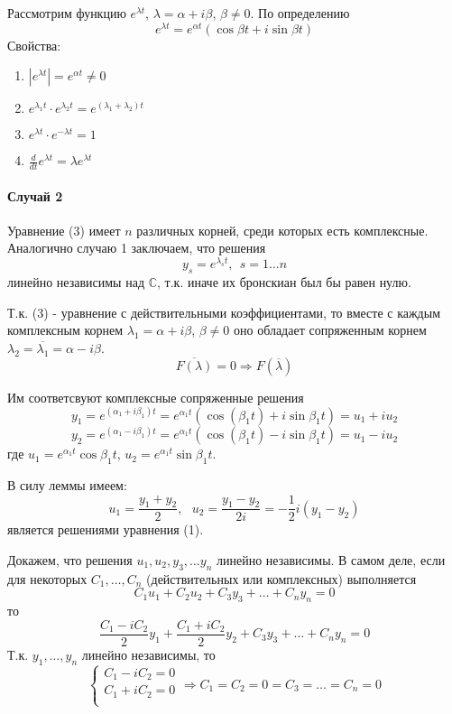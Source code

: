 Рассмотрим функцию $e^{\lambda t}$, $\lambda = \alpha + i \beta$, $\beta \neq 0$. По определению
\[ e^{\lambda t} = e^{\alpha t}(\cos \beta t + i\sin \beta t) \]
Свойства:
\begin{enumerate}
	\item $|e^{\lambda t}| = e^{\alpha t} \neq 0$
	\item $e^{\lambda_1 t} \cdot e^{\lambda_2 t} = e^{(\lambda_1 + \lambda_2)t}$
	\item $e^{\lambda t} \cdot e^{-\lambda t} = 1 $
	\item $\frac{d}{dt} e^{\lambda t}= \lambda e^{\lambda t}$
\end{enumerate}

\paragraph{Случай 2}
Уравнение (3) имеет $n$ различных корней, среди которых есть комплексные. Аналогично случаю 1 заключаем, что решения
\[ y_s = e^{\lambda_s t},~~ s = 1 \ldots n \]
линейно независимы над $\mathbb{C}$, т.к. иначе их бронскиан был бы равен нулю.

Т.к. (3) - уравнение с действительными коэффициентами, то вместе с каждым комплексным корнем $\lambda_1 = \alpha + i\beta$, $\beta \neq 0$ оно обладает сопряженным корнем $\lambda_2 = \overline{\lambda_1} = \alpha - i\beta$.
\[ \overline{F(\lambda)} = 0  \Rightarrow F(\overline{\lambda}) \]

Им соответсвуют комплексные сопряженные решения
\[ y_1 = e^{(\alpha_1 + i \beta_1)t} = e^{\alpha_1t}(\cos (\beta_1t) + i\sin{\beta_1t}) = u_1 + iu_2 \]
\[ y_2 = e^{(\alpha_1 - i \beta_1)t} = e^{\alpha_1t}(\cos (\beta_1t) - i\sin{\beta_1t}) = u_1 - iu_2 \]
где $u_1 = e^{\alpha_1 t}\cos\beta_1t$, $u_2 = e^{\alpha_1 t}\sin\beta_1t$.

В силу леммы имеем:
\[ u_1 = \frac{y_1 + y_2}{2},~~~ u_2 = \frac{y_1 - y_2}{2i} = -\frac{1}{2}i(y_1 - y_2) \]
является решениями уравнения (1).

Докажем, что решения $u_1, u_2, y_3, \ldots y_n$ линейно независимы. В самом деле, если для некоторых $C_1, \ldots, C_n$ (действительных или комплексных) выполняется
\[ C_1u_1 + C_2u_2 + C_3y_3 + \ldots + C_ny_n = 0\]
то
\[ \frac{C_1 - i C_2}{2}y_1 + \frac{C_1 + i C_2}{2}y_2 + C_3y_3 + \ldots + C_ny_n = 0 \]
Т.к. $y_1, \ldots, y_n$ линейно независимы, то
\[ 
\begin{cases}
C_1 - iC_2 = 0 \\
C_1 + iC_2 = 0 \\
\end{cases}
\Rightarrow
C_1 = C_2 = 0 = C_3 = \ldots = C_n = 0
\]

